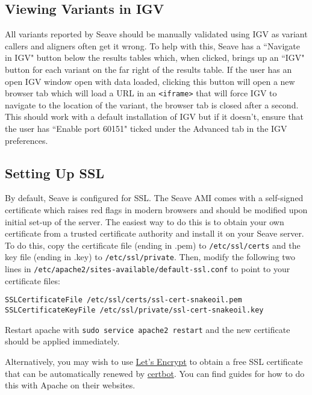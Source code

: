 \documentclass[11pt, a4paper]{article}
\begin{document}

\subsection{Viewing Variants in IGV}

All variants reported by Seave should be manually validated using IGV as variant callers and aligners often get it wrong. To help with this, Seave has a ``Navigate in IGV" button below the results tables which, when clicked, brings up an ``IGV" button for each variant on the far right of the results table. If the user has an open IGV window open with data loaded, clicking this button will open a new browser tab which will load a URL in an \texttt{<iframe>} that will force IGV to navigate to the location of the variant, the browser tab is closed after a second. This should work with a default installation of IGV but if it doesn't, ensure that the user has ``Enable port 60151" ticked under the Advanced tab in the IGV preferences.


\subsection{Setting Up SSL}\label{settingUpSSL}

By default, Seave is configured for SSL. The Seave AMI comes with a self-signed certificate which raises red flags in modern browsers and should be modified upon initial set-up of the server. The easiest way to do this is to obtain your own certificate from a trusted certificate authority and install it on your Seave server. To do this, copy the certificate file (ending in .pem) to \texttt{/etc/ssl/certs} and the key file (ending in .key) to \texttt{/etc/ssl/private}. Then, modify the following two lines in \texttt{/etc/apache2/sites-available/default-ssl.conf} to point to your certificate files:

\begin{lstlisting}
SSLCertificateFile /etc/ssl/certs/ssl-cert-snakeoil.pem
SSLCertificateKeyFile /etc/ssl/private/ssl-cert-snakeoil.key
\end{lstlisting}

Restart apache with \texttt{sudo service apache2 restart} and the new certificate should be applied immediately.

Alternatively, you may wish to use \href{https://letsencrypt.org}{Let's Encrypt} to obtain a free SSL certificate that can be automatically renewed by \href{https://certbot.eff.org}{certbot}. You can find guides for how to do this with Apache on their websites.
\end{document}
